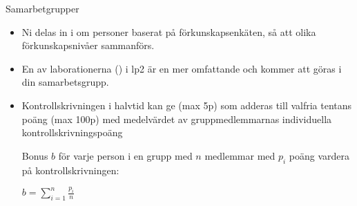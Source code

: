 \fi

\ifkompendium\else




\begin{SlideExtra}{Samarbetgrupper}\footnotesize
\begin{itemize}
\item Ni delas in i  om  personer baserat på förkunskapsenkäten, så att olika förkunskapsnivåer sammanförs.
\item En av laborationerna () i lp2 är en mer omfattande  och kommer att göras i din samarbetsgrupp. \\ \vspace{1em}
\item Kontrollskrivningen i halvtid kan ge  (max 5p) som adderas till valfria tentans poäng (max 100p) med medelvärdet av gruppmedlemmarnas individuella kontrollskrivningspoäng
\scriptsize \parbox{7cm}{Bonus $b$ för varje person i en grupp med $n$ medlemmar med $p_i$ poäng vardera på kontrollskrivningen:}
 \hspace{5mm} $\displaystyle b = \sum\limits_{i=1}^n \frac{p_i}{n}$
\end{itemize}
\end{SlideExtra}



